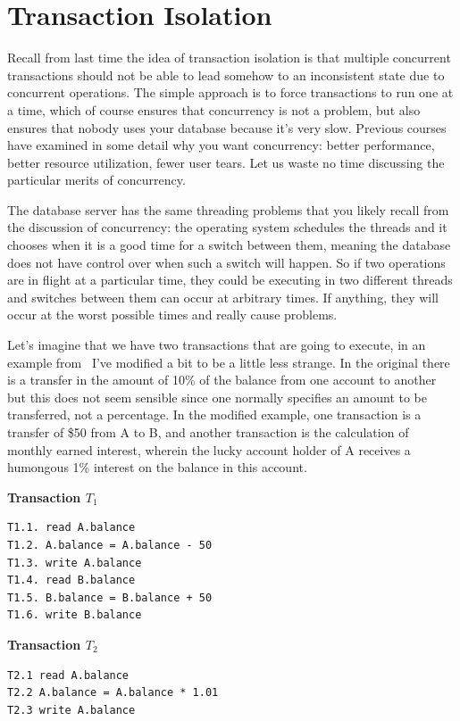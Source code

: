 




\section*{Transaction Isolation}

Recall from last time the idea of transaction isolation is that multiple concurrent transactions should not be able to lead somehow to an inconsistent state due to concurrent operations. The simple approach is to force transactions to run one at a time, which of course ensures that concurrency is not a problem, but also ensures that nobody uses your database because it's very slow. Previous courses have examined in some detail why you want concurrency: better performance, better resource utilization, fewer user tears. Let us waste no time discussing the particular merits of concurrency. 

The database server has the same threading problems that you likely recall from the discussion of concurrency: the operating system schedules the threads and it chooses when it is a good time for a switch between them, meaning the database does not have control over when such a switch will happen. So if two operations are in flight at a particular time, they could be executing in two different threads and switches between them can occur at arbitrary times. If anything, they will occur at the worst possible times and really cause problems.

Let's imagine that we have two transactions that are going to execute, in an example from~\cite{dsc} I've modified a bit to be a little less strange. In the original there is a transfer in the amount of 10\% of the balance from one account to another but this does not seem sensible since one normally specifies an amount to be transferred, not a percentage. In the modified example, one transaction is a transfer of \$50 from A to B, and another transaction is the calculation of monthly earned interest, wherein the lucky account holder of A receives a humongous 1\% interest on the balance in this account.

\begin{multicols}{2}
\textbf{Transaction $T_{1}$}
\begin{verbatim}
T1.1. read A.balance
T1.2. A.balance = A.balance - 50
T1.3. write A.balance
T1.4. read B.balance
T1.5. B.balance = B.balance + 50
T1.6. write B.balance
\end{verbatim}
\columnbreak
\textbf{Transaction $T_{2}$}

\begin{verbatim}
T2.1 read A.balance
T2.2 A.balance = A.balance * 1.01
T2.3 write A.balance
\end{verbatim}

\end{multicols}


